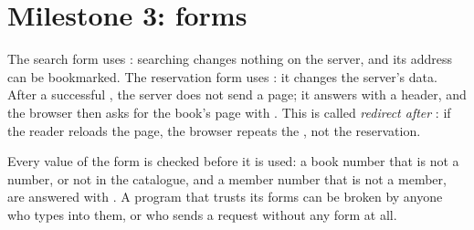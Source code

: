 \section{Milestone 3: forms}\label{sec:g10:project-web-application:m3}

The search form uses : searching changes nothing on the server, and its address can be bookmarked. The
reservation form uses : it changes the server's data. After a successful , the server does not send a
page; it answers  with a  header, and the browser then asks for the book's page
with . This is called \emph{redirect after }: if the reader reloads the page, the browser repeats the ,
not the reservation.

\label{lst:g10:project-web-application:m3}

Every value of the form is checked before it is used: a book number that is not a number, or not in the catalogue,
and a member number that is not a member, are answered with . A program that trusts its forms
can be broken by anyone who types into them, or who sends a request without any form at all.

\label{lst:g10:project-web-application:run-m3}

\label{out:g10:project-web-application:run-m3}

